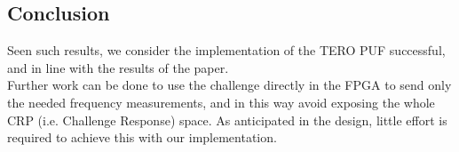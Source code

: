 \subsection{Conclusion}
Seen such results, we consider the implementation of the TERO PUF successful, and in line with the results of the paper. \\
Further work can be done to use the challenge directly in the FPGA to send only the needed frequency measurements, and in this way avoid
exposing the whole CRP (i.e. Challenge Response) space. As anticipated in the design, little effort is required to achieve this with our implementation.